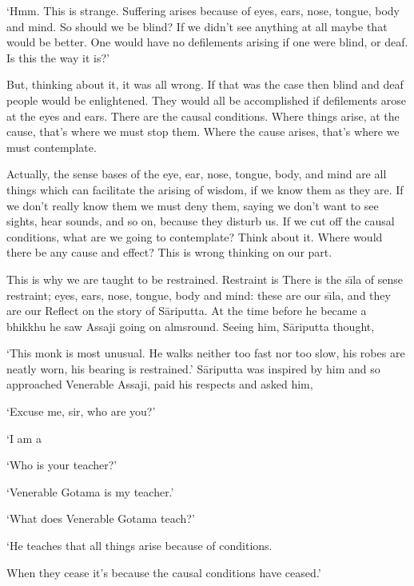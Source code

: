 `Hmm. This is strange. Suffering arises because of eyes, ears, nose, tongue, body and mind. So should we be blind? If we didn't see anything at all maybe that would be better. One would have no defilements arising if one were blind, or deaf. Is this the way it is?'

But, thinking about it, it was all wrong. If that was the case then blind and deaf people would be enlightened. They would all be accomplished if defilements arose at the eyes and ears. There are the causal conditions. Where things arise, at the cause, that's where we must stop them. Where the cause arises, that's where we must contemplate. 

Actually, the sense bases of the eye, ear, nose, tongue, body, and mind are all things which can facilitate the arising of wisdom, if we know them as they are. If we don't really know them we must deny them, saying we don't want to see sights, hear sounds, and so on, because they disturb us. If we cut off the causal conditions, what are we going to contemplate? Think about it. Where would there be any cause and effect? This is wrong thinking on our part. 

This is why we are taught to be restrained. Restraint is  There is the s\={\i}la of sense restraint; eyes, ears, nose, tongue, body and mind: these are our s\={\i}la, and they are our  Reflect on the story of S\=ariputta. At the time before he became a bhikkhu he saw Assaji  going on almsround. Seeing him, S\=ariputta thought, 

`This monk is most unusual. He walks neither too fast nor too slow, his robes are neatly worn, his bearing is restrained.' S\=ariputta was inspired by him and so approached Venerable Assaji, paid his respects and asked him,

`Excuse me, sir, who are you?'

`I am a 

`Who is your teacher?'

`Venerable Gotama is my teacher.'

`What does Venerable Gotama teach?'

`He teaches that all things arise because of conditions.

When they cease it's because the causal conditions have ceased.'

